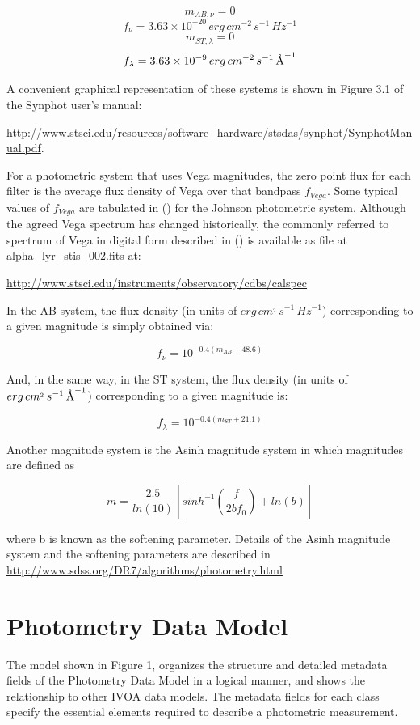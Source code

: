 \documentclass[11pt,a4paper]{ivoa}
\newcommand{\angstrom}{\textup{\AA}}
\begin{document}
\[
m_{AB,\nu } = 0
\]
\[
f_\nu = 3.63\times 10^{-20}\,erg\,cm^{-2}\,s^{-1}\,Hz^{-1}
\]
\[
m_{ST,\lambda } = 0
\]
\[
f_\lambda = 3.63\times 10^{-9}\,erg\,cm^{-2}\,s^{-1}\,\angstrom^{-1} 
\]


A convenient graphical representation of these systems is shown in Figure 3.1 of the Synphot user’s manual:
\par

\url{http://www.stsci.edu/resources/software_hardware/stsdas/synphot/SynphotManual.pdf}.
\par

For a photometric system that uses Vega magnitudes, the zero point flux for each filter is the average flux density of Vega over that bandpass $f_{Vega}$. Some typical values of $f_{Vega}$ are tabulated in (\cite{2001eaa..book.....M}) for the Johnson photometric system. Although the agreed Vega spectrum has changed historically, the commonly referred to spectrum of Vega in digital form described in (\cite{2004AJ....127.3508B}) is available as file at alpha\_lyr\_stis\_002.fits at:\par
\url{http://www.stsci.edu/instruments/observatory/cdbs/calspec}
\par

In the AB system, the flux density (in units of $erg\, cm^{_2}\, s^{-1}\, Hz^{-1}$) corresponding to a given magnitude is simply obtained via:
\par
\[
f_{\nu} = 10^{-0.4(m_{AB}+48.6)} 
\]

And, in the same way, in the ST system, the flux density (in units of $erg\, cm^{_2}\, s^{-1}\, \angstrom^{-1}$) corresponding to a given magnitude is:
\par
\[
f_{\lambda} = 10^{-0.4(m_{ST}+21.1)} 
\]

Another magnitude system is the Asinh magnitude system in which magnitudes are defined as 
\par
\[
m = \frac{2.5}{ln(10)} \left[ sinh^{-1}(\frac{f}{2bf_0}) +ln(b) \right]
\]


where b is known as the softening parameter. Details of the Asinh magnitude system and the softening parameters are described in \url{http://www.sdss.org/DR7/algorithms/photometry.html}
\par

\section{Photometry Data Model}
The model shown in Figure 1, organizes the structure and detailed metadata fields of the Photometry Data Model in a logical manner, and shows the relationship to other IVOA data models. The metadata fields for each class specify the essential elements required to describe a photometric measurement.
\par
\end{document}
